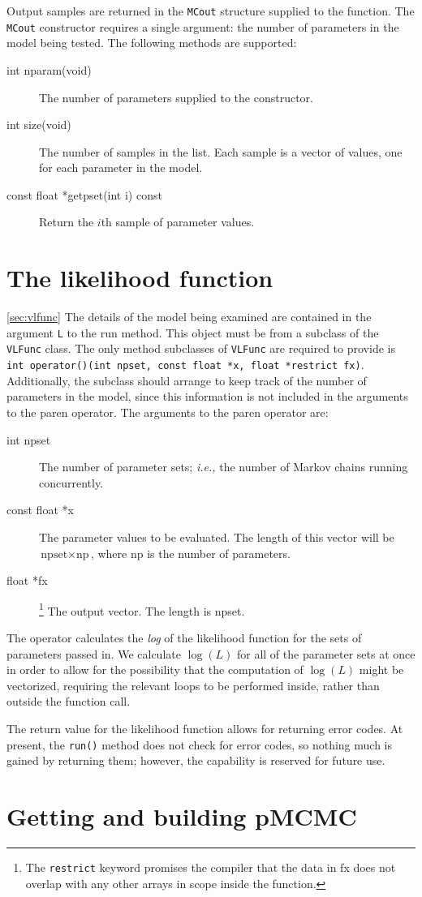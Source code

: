 \documentclass[11pt]{article}
\begin{document}
Output samples are returned in the \texttt{MCout} structure supplied
to the function.  The \texttt{MCout} constructor requires a single
argument:  the number of parameters in the model being tested.  The
following methods are supported:
\begin{description}
\item[int nparam(void)] The number of parameters supplied to the
  constructor.
\item[int size(void)] The number of samples in the list.  Each sample
  is a vector of values, one for each parameter in the model.
\item[const float *getpset(int i) const] Return the $i$th sample of
  parameter values.
\end{description}

\section{The likelihood function}
\ref{sec:vlfunc}
The details of the model being examined are contained in the argument
\texttt{L} to the run method.  This object must be from a subclass of
the \texttt{VLFunc} class.  The only method subclasses of
\texttt{VLFunc} are required to provide is
\verb=int operator()(int npset, const float *x, float *restrict fx)=.
Additionally, the subclass should arrange to keep track of the number
of parameters in the model, since this information is not included in
the arguments to the paren operator.  The arguments to the paren
operator are:
\begin{description}
\item[int npset] The number of parameter sets; \emph{i.e.,} the number
  of Markov chains running concurrently.
\item[const float *x] The parameter values to be evaluated.  The
  length of this vector will be $\text{npset} \times \text{np}$, where
  np is the number of parameters.
\item[float *fx]\footnote{The \texttt{restrict} keyword promises the
  compiler that the data in fx does not overlap with any other arrays
  in scope inside the function.}  The output vector.  The length is npset.
\end{description}

The operator calculates the \emph{log} of the likelihood function for
the sets of parameters passed in.  We calculate $\log(L)$ for all of
the parameter sets at once in order to allow for the possibility that
the computation of $\log(L)$ might be vectorized, requiring the
relevant loops to be performed inside, rather than outside the
function call.

The return value for the likelihood function allows for returning error codes.
At present, the \texttt{run()} method does not check for error codes,
so nothing much is gained by returning them; however, the capability
is reserved for future use.  

\section{Getting and building {pMCMC}}
\end{document}
